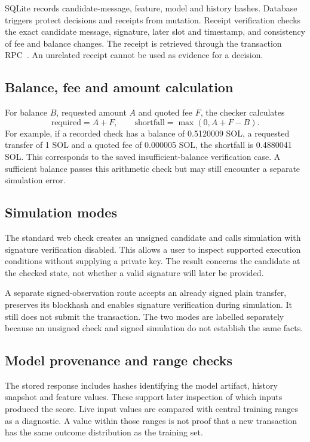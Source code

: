 \documentclass[12pt,a4paper,oneside]{report}
\begin{document}
SQLite records candidate-message, feature, model and history hashes. Database triggers protect decisions and receipts from mutation. Receipt verification checks the exact candidate message, signature, later slot and timestamp, and consistency of fee and balance changes. The receipt is retrieved through the transaction RPC~\cite{gettransaction}. An unrelated receipt cannot be used as evidence for a decision.

\subsection{Balance, fee and amount calculation}
For balance $B$, requested amount $A$ and quoted fee $F$, the checker calculates
\begin{equation}\mathrm{required}=A+F,\qquad \mathrm{shortfall}=\max(0,A+F-B).\end{equation}
For example, if a recorded check has a balance of 0.5120009 SOL, a requested transfer of 1 SOL and a quoted fee of 0.000005 SOL, the shortfall is 0.4880041 SOL. This corresponds to the saved insufficient-balance verification case. A sufficient balance passes this arithmetic check but may still encounter a separate simulation error.
\subsection{Simulation modes}
The standard web check creates an unsigned candidate and calls simulation with signature verification disabled. This allows a user to inspect supported execution conditions without supplying a private key. The result concerns the candidate at the checked state, not whether a valid signature will later be provided.

A separate signed-observation route accepts an already signed plain transfer, preserves its blockhash and enables signature verification during simulation. It still does not submit the transaction. The two modes are labelled separately because an unsigned check and signed simulation do not establish the same facts.
\subsection{Model provenance and range checks}
The stored response includes hashes identifying the model artifact, history snapshot and feature values. These support later inspection of which inputs produced the score. Live input values are compared with central training ranges as a diagnostic. A value within those ranges is not proof that a new transaction has the same outcome distribution as the training set.
\end{document}
